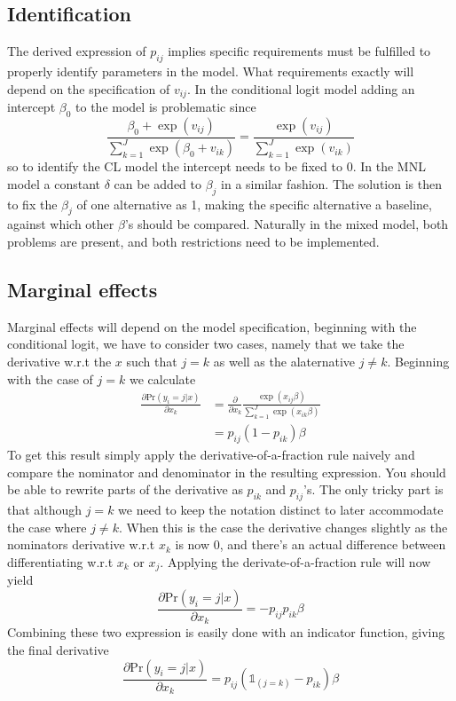 \subsection{Identification}
The derived expression of $p_{ij}$ implies specific requirements must be fulfilled to properly identify parameters in the model. What requirements exactly will depend on the specification of $v_{ij}$. In the conditional logit model adding an intercept $\beta_0$ to the model is problematic since
\begin{equation}
\frac{\beta_0 + \exp(v_{ij})}{ \sum_{k=1}^J  \exp(\beta_0 +v_{ik})} =
\frac{\exp(v_{ij})}{ \sum_{k=1}^J \exp(v_{ik})}
\end{equation}
so to identify the CL model the intercept needs to be fixed to 0. In the MNL model a constant $\delta$ can be added to $\beta_j$ in a similar fashion. The solution is then to fix the $\beta_j$ of one alternative as 1, making the specific alternative a baseline, against which other $\beta$'s should be compared. Naturally in the mixed model, both problems are present, and both restrictions need to be implemented.

\subsection{Marginal effects}
Marginal effects will depend on the model specification, beginning with the conditional logit, we have to consider two cases, namely that we take the derivative w.r.t the $x$ such that $j=k$ as well as the alaternative $j\neq k$. Beginning with the case of $j=k$ we calculate
\begin{equation}
\begin{split}
\frac{\partial \textrm{Pr}(y_i = j|x)}{\partial x_k} &= \frac{\partial}{\partial x_k} \frac{\exp(x_{ij}\beta )}{ \sum_{k=1}^J \exp(x_{ik}\beta)} \\
& = p_{ij}(1-p_{ik})\beta
\end{split}
\end{equation}
To get this result simply apply the derivative-of-a-fraction rule naively and compare the nominator and denominator in the resulting expression. You should be able to rewrite parts of the derivative as $p_{ik}$ and $p_{ij}$'s. The only tricky part is that although $j=k$ we need to keep the notation distinct to later accommodate the case where $j\neq k$. When this is the case the derivative changes slightly as the nominators derivative w.r.t $x_k$ is now 0, and there's an actual difference between differentiating w.r.t $x_k$ or $x_j$. Applying the derivate-of-a-fraction rule will now yield
\begin{equation}
\frac{\partial \textrm{Pr}(y_i = j|x)}{\partial x_k} = -p_{ij}p_{ik}\beta
\end{equation}
Combining these two expression is easily done with an indicator function, giving the final derivative
\begin{equation}
\frac{\partial \textrm{Pr}(y_i = j|x)}{\partial x_k}= p_{ij}(\mathds{1}_{(j=k)}-p_{ik})\beta
\end{equation}

